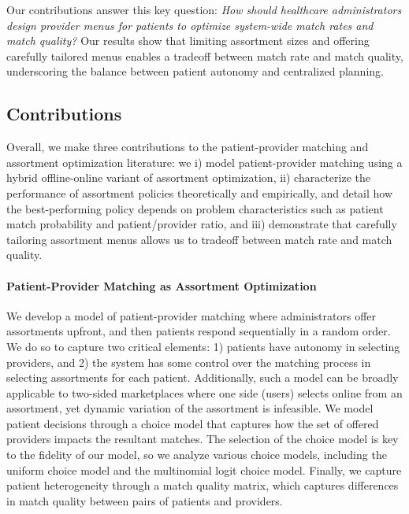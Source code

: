 \documentclass[11pt]{article}
\begin{document}
Our contributions answer this key question: \textit{How should healthcare administrators design provider menus for patients to optimize system-wide match rates and match quality?}
Our results show that limiting assortment sizes and offering carefully tailored menus enables a tradeoff between match rate and match quality, underscoring the balance between patient autonomy and centralized planning.

\subsection{Contributions}
Overall, we make three contributions to the patient-provider matching and assortment optimization literature: we i) model patient-provider matching using a hybrid offline-online variant of assortment optimization, ii) characterize the performance of assortment policies theoretically and empirically, and detail how the best-performing policy depends on problem characteristics such as patient match probability and patient/provider ratio, and iii) demonstrate that carefully tailoring assortment menus allows us to tradeoff between match rate and match quality.  

\paragraph{Patient-Provider Matching as Assortment Optimization}
We develop a model of patient-provider matching where administrators offer assortments upfront, and then patients respond sequentially in a random order. 
We do so to capture two critical elements: 1) patients have autonomy in selecting providers, and 2) the system has some control over the matching process in selecting assortments for each patient. 
Additionally, such a model can be broadly applicable to two-sided marketplaces where one side (users) selects online from an assortment, yet dynamic variation of the assortment is infeasible. 
We model patient decisions through a choice model that captures how the set of offered providers impacts the resultant matches. 
The selection of the choice model is key to the fidelity of our model, so we analyze various choice models, including the uniform choice model and the multinomial logit choice model.
Finally, we capture patient heterogeneity through a match quality matrix, which captures differences in match quality between pairs of patients and providers. 
\end{document}
